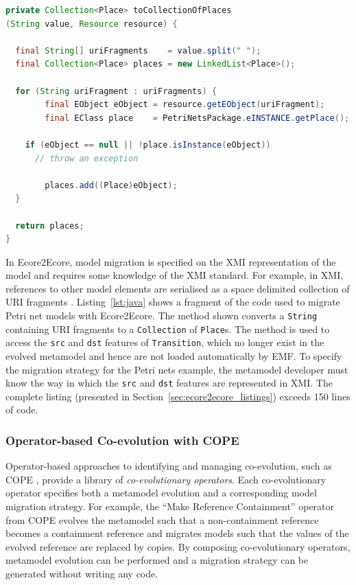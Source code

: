 \begin{lstlisting}[float=tbp, caption=Java method for deserialising a reference., label=lst:java, language=Java]
private Collection<Place> toCollectionOfPlaces
(String value, Resource resource) {

  final String[] uriFragments    = value.split(" ");
  final Collection<Place> places = new LinkedList<Place>();
 
  for (String uriFragment : uriFragments) {
		final EObject eObject = resource.getEObject(uriFragment);
		final EClass place    = PetriNetsPackage.eINSTANCE.getPlace();

    if (eObject == null || !place.isInstance(eObject))
      // throw an exception
						
		places.add((Place)eObject);
  }
 
  return places;
}
\end{lstlisting}

In Ecore2Ecore, model migration is specified on the XMI representation of the model and requires some knowledge of the XMI standard. For example, in XMI, references to other model elements are serialised as a space delimited collection of URI fragments \cite{steinberg09emf}. Listing~\ref{lst:java} shows a fragment of the code used to migrate Petri net models with Ecore2Ecore. The method shown converts a \texttt{String} containing URI fragments to a \texttt{Collection} of \texttt{Place}s. The method is used to access the \texttt{src} and \texttt{dst} features of \texttt{Tr\-an\-si\-ti\-on}, which no longer exist in the evolved metamodel and hence are not loaded automatically by EMF. To specify the migration strategy for the Petri nets example, the metamodel developer must know the way in which the \texttt{src} and \texttt{dst} features are represented in XMI. The complete listing (presented in Section~\ref{sec:ecore2ecore_listings}) exceeds 150 lines of code.

\subsubsection{Operator-based Co-evolution with COPE}
\label{subsubsec:cope}

Operator-based approaches to identifying and managing co-evolution, such as COPE \cite{herrmannsdoerfer09cope}, provide a library of \emph{co-evolutionary operators}. Each co-evolutionary operator specifies both a metamodel evolution and a corresponding model migration strategy. For example, the ``Make Reference Containment'' operator from COPE \cite{herrmannsdoerfer09cope} evolves the metamodel such that a non-containment reference becomes a containment reference and migrates models such that the values of the evolved reference are replaced by copies. By composing co-evolutionary operators, metamodel evolution can be performed and a migration strategy can be generated without writing any code.

